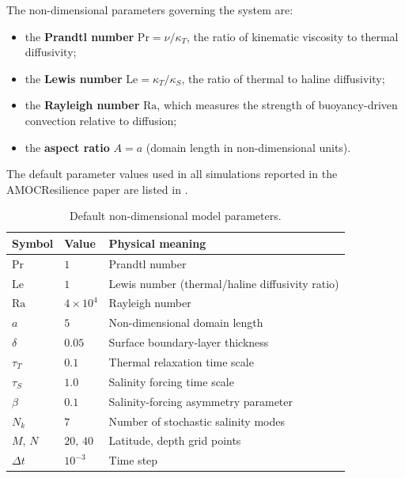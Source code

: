 \documentclass[12pt, a4paper]{article}
\renewcommand{\Pr}{\mathrm{Pr}}
\newcommand{\Le}{\mathrm{Le}}
\newcommand{\Ra}{\mathrm{Ra}}
\begin{document}
The non-dimensional parameters governing the system are:
\begin{itemize}
  \item the \textbf{Prandtl number} $\Pr = \nu/\kappa_T$, the ratio of
        kinematic viscosity to thermal diffusivity;
  \item the \textbf{Lewis number} $\Le = \kappa_T/\kappa_S$, the ratio of
        thermal to haline diffusivity;
  \item the \textbf{Rayleigh number} $\Ra$, which measures the strength of
        buoyancy-driven convection relative to diffusion;
  \item the \textbf{aspect ratio} $A = a$ (domain length in non-dimensional
        units).
\end{itemize}
The default parameter values used in all simulations reported in the
AMOCResilience paper are listed in .

\begin{table}[h]
  \centering
  \caption{Default non-dimensional model parameters.}
  \label{tab:params}
  \begin{tabular}{lll}
    \toprule
    Symbol & Value & Physical meaning \\
    \midrule
    $\Pr$        & $1$              & Prandtl number \\
    $\Le$        & $1$              & Lewis number (thermal/haline diffusivity ratio) \\
    $\Ra$        & $4\times10^4$    & Rayleigh number \\
    $a$          & $5$              & Non-dimensional domain length \\
    $\delta$     & $0.05$           & Surface boundary-layer thickness \\
    $\tau_T$     & $0.1$            & Thermal relaxation time scale \\
    $\tau_S$     & $1.0$            & Salinity forcing time scale \\
    $\beta$      & $0.1$            & Salinity-forcing asymmetry parameter \\
    $N_k$        & $7$              & Number of stochastic salinity modes \\
    $M,\,N$      & $20,\,40$        & Latitude, depth grid points \\
    $\Delta t$   & $10^{-3}$        & Time step \\
    \bottomrule
  \end{tabular}
\end{table}
\end{document}
